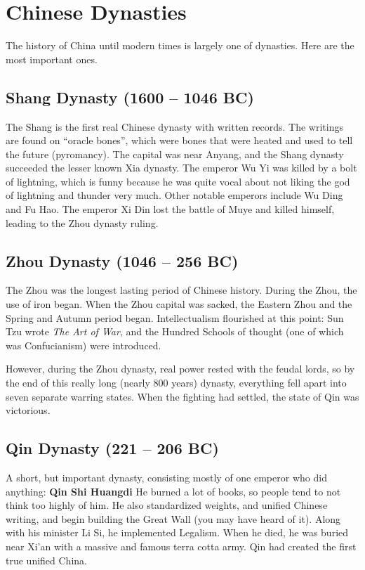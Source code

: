 \section{Chinese Dynasties}

The history of China until modern times is largely one of dynasties.
Here are the most important ones.

\subsection*{Shang Dynasty (1600 -- 1046 BC)}

The Shang is the first real Chinese dynasty with written records.
The writings are found on ``oracle bones'',
which were bones that were heated and used to tell the future (pyromancy).
The capital was near Anyang, and the Shang dynasty succeeded the lesser known Xia dynasty.
The emperor Wu Yi was killed by a bolt of lightning,
which is funny because he was quite vocal about not liking the god of lightning and thunder very much.
Other notable emperors include Wu Ding and Fu Hao.
The emperor Xi Din lost the battle of Muye and killed himself,
leading to the Zhou dynasty ruling.

\subsection*{Zhou Dynasty (1046 -- 256 BC)}

The Zhou was the longest lasting period of Chinese history.
During the Zhou, the use of iron began.
When the Zhou capital was sacked, the Eastern Zhou and the Spring and Autumn period began.
Intellectualism flourished at this point:
Sun Tzu wrote \textit{The Art of War},
and the Hundred Schools of thought (one of which was Confucianism) were introduced.

However, during the Zhou dynasty, real power rested with the feudal lords, so
by the end of this really long (nearly 800 years) dynasty,
everything fell apart into seven separate warring states.
When the fighting had settled, the state of Qin was victorious.

\subsection*{Qin Dynasty (221 -- 206 BC)}

A short, but important dynasty, consisting mostly of one emperor who did anything: \textbf{Qin Shi Huangdi}
He burned a lot of books, so people tend to not think too highly of him.
He also standardized weights, and unified Chinese writing,
and begin building the Great Wall (you may have heard of it).
Along with his minister Li Si, he implemented Legalism.
When he died, he was buried near Xi'an with a massive and famous terra cotta army.
Qin had created the first true unified China.

